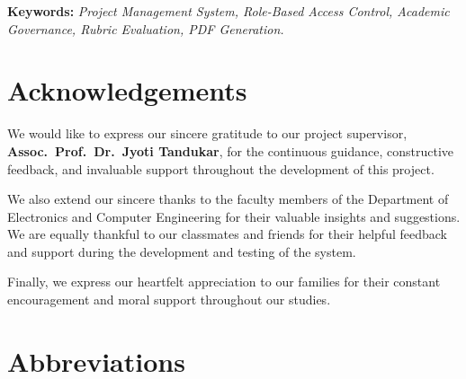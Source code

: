 \documentclass[12pt,a4paper]{report}
\begin{document}
\noindent\textbf{Keywords:} \textit{Project Management System, Role-Based Access Control, Academic Governance, Rubric Evaluation, PDF Generation.}

\chapter*{Acknowledgements}

We would like to express our sincere gratitude to our project supervisor, \textbf{Assoc.\ Prof.\ Dr.\ Jyoti Tandukar}, for the continuous guidance, constructive feedback, and invaluable support throughout the development of this project.

We also extend our sincere thanks to the faculty members of the Department of Electronics and Computer Engineering for their valuable insights and suggestions. We are equally thankful to our classmates and friends for their helpful feedback and support during the development and testing of the system.

Finally, we express our heartfelt appreciation to our families for their constant encouragement and moral support throughout our studies.

\tableofcontents
\listoffigures
{}
\listoftables
{}

\chapter*{Abbreviations}
\end{document}
